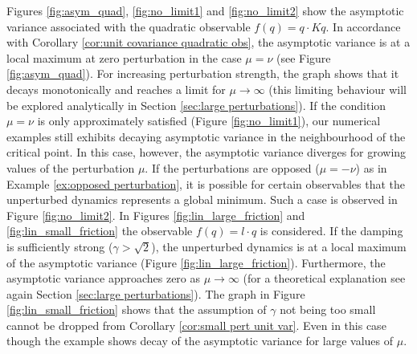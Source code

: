 Figures \ref{fig:asym_quad}, \ref{fig:no_limit1} and \ref{fig:no_limit2}  show the asymptotic variance associated with the quadratic observable $f(q)=q\cdot K q$. In accordance with Corollary \ref{cor:unit covariance quadratic obs}, the asymptotic variance is at a  local maximum at zero perturbation in the case $\mu=\nu$ (see Figure \ref{fig:asym_quad}). For increasing perturbation strength, the graph shows that it decays monotonically
and reaches a limit for $\mu\rightarrow\infty$ (this limiting behaviour will be explored analytically in Section \ref{sec:large perturbations}). If the condition $\mu=\nu$ is only approximately satisfied (Figure \ref{fig:no_limit1}), our numerical examples still exhibits decaying asymptotic variance in the neighbourhood of the critical point. In this case, however, the asymptotic variance diverges for growing values of the perturbation $\mu$. If the perturbations are opposed ($\mu=-\nu$) as in Example \ref{ex:opposed perturbation}, it is possible for certain observables that the unperturbed dynamics represents a global minimum. Such a case is observed in Figure \ref{fig:no_limit2}. In Figures \ref{fig:lin_large_friction} and \ref{fig:lin_small_friction} the observable $f(q)=l\cdot q$ is considered. If the damping is sufficiently strong ($\gamma > \sqrt{2}$), the unperturbed dynamics is at a local maximum of the asymptotic variance (Figure \ref{fig:lin_large_friction}). Furthermore, the asymptotic variance approaches zero as $\mu \rightarrow \infty$ (for a theoretical explanation see again Section \ref{sec:large perturbations}). The graph in Figure \ref{fig:lin_small_friction} shows that the assumption of $\gamma$ not being too small cannot be dropped from Corollary \ref{cor:small pert unit var}. Even in this case though the example shows decay of the asymptotic variance for large values of $\mu$.    

